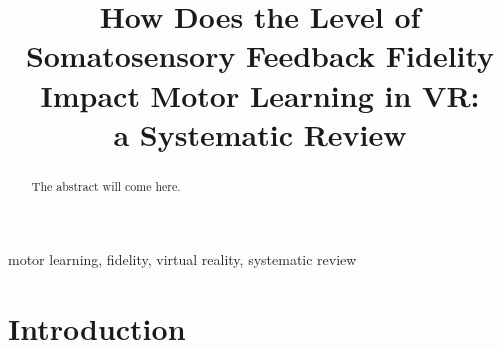 \documentclass[conference]{IEEEtran}
\begin{document}
\title{How Does the Level of Somatosensory Feedback Fidelity Impact Motor Learning in VR: \\a Systematic Review}

\author{
\and
{}
\and
{}
}

\maketitle

\begin{abstract}
The abstract will come here. \\

\end{abstract}

\begin{IEEEkeywords}
motor learning, fidelity, virtual reality, systematic review
\end{IEEEkeywords}

\section{Introduction}

\end{document}

